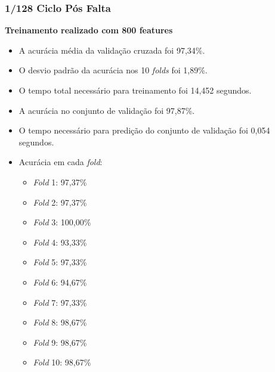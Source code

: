 \subsubsection{1/128 Ciclo Pós Falta}
\textbf{Treinamento realizado com 800 features}
\begin{itemize}
    \item A acurácia média da validação cruzada foi 97,34\%.
    \item O desvio padrão da acurácia nos 10 \textit{folds} foi 1,89\%.
    \item O tempo total necessário para treinamento foi 14,452 segundos.
    \item A acurácia no conjunto de validação foi 97,87\%.
    \item O tempo necessário para predição do conjunto de validação foi 0,054 segundos.
    \item Acurácia em cada \textit{fold}:
    \begin{itemize}
        \item \textit{Fold} 1: 97,37\%
        \item \textit{Fold} 2: 97,37\%
        \item \textit{Fold} 3: 100,00\%
        \item \textit{Fold} 4: 93,33\%
        \item \textit{Fold} 5: 97,33\%
        \item \textit{Fold} 6: 94,67\%
        \item \textit{Fold} 7: 97,33\%
        \item \textit{Fold} 8: 98,67\%
        \item \textit{Fold} 9: 98,67\%
        \item \textit{Fold} 10: 98,67\%
    \end{itemize}
\end{itemize}

